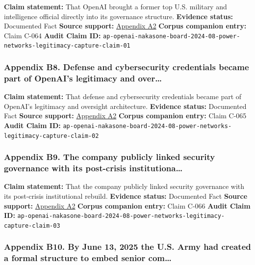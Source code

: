 \documentclass[
  american,
  11pt,
  letterpaper,
]{article}
\begin{document}
\textbf{Claim statement:} That OpenAI brought a former top U.S. military
and intelligence official directly into its governance structure.
\textbf{Evidence status:} Documented Fact \textbf{Source support:}
\hyperref[appendix-a2-openai-appoints-former-top-us-cyberwarrior-paul-nakasone-to-its-board-of-directors]{Appendix
A2} \textbf{Corpus companion entry:} Claim C-064 \textbf{Audit Claim
ID:}
\texttt{ap-openai-nakasone-board-2024-08-power-networks-legitimacy-capture-claim-01}

\subsubsection{Appendix B8. Defense and cybersecurity credentials became
part of OpenAI's legitimacy and
over\ldots{}}\label{appendix-b8-defense-and-cybersecurity-credentials-became-part-of-openai-s-legitimacy-and-over}

\textbf{Claim statement:} That defense and cybersecurity credentials
became part of OpenAI's legitimacy and oversight architecture.
\textbf{Evidence status:} Documented Fact \textbf{Source support:}
\hyperref[appendix-a2-openai-appoints-former-top-us-cyberwarrior-paul-nakasone-to-its-board-of-directors]{Appendix
A2} \textbf{Corpus companion entry:} Claim C-065 \textbf{Audit Claim
ID:}
\texttt{ap-openai-nakasone-board-2024-08-power-networks-legitimacy-capture-claim-02}

\subsubsection{Appendix B9. The company publicly linked security
governance with its post-crisis
institutiona\ldots{}}\label{appendix-b9-the-company-publicly-linked-security-governance-with-its-post-crisis-institutiona}

\textbf{Claim statement:} That the company publicly linked security
governance with its post-crisis institutional rebuild. \textbf{Evidence
status:} Documented Fact \textbf{Source support:}
\hyperref[appendix-a2-openai-appoints-former-top-us-cyberwarrior-paul-nakasone-to-its-board-of-directors]{Appendix
A2} \textbf{Corpus companion entry:} Claim C-066 \textbf{Audit Claim
ID:}
\texttt{ap-openai-nakasone-board-2024-08-power-networks-legitimacy-capture-claim-03}

\subsubsection{Appendix B10. By June 13, 2025 the U.S. Army had created
a formal structure to embed senior
com\ldots{}}\label{appendix-b10-by-june-13-2025-the-u-s-army-had-created-a-formal-structure-to-embed-senior-com}
\end{document}
